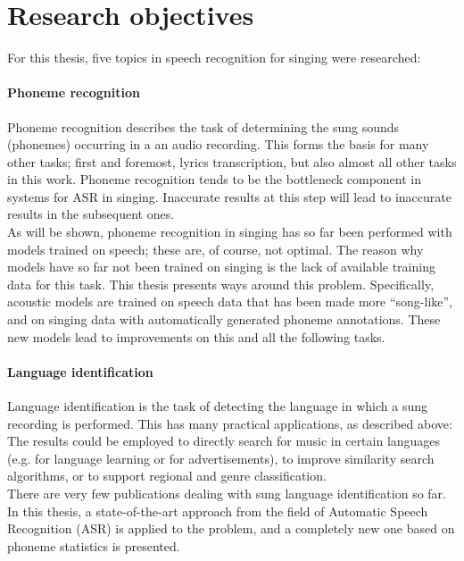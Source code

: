 \section{Research objectives}
For this thesis, five topics in speech recognition for singing were researched:

\paragraph{Phoneme recognition}
Phoneme recognition describes the task of determining the sung sounds (phonemes) occurring in a an audio recording. This forms the basis for many other tasks; first and foremost, lyrics transcription, but also almost all other tasks in this work. Phoneme recognition tends to be the bottleneck component in systems for ASR in singing. Inaccurate results at this step will lead to inaccurate results in the subsequent ones.\\
As will be shown, phoneme recognition in singing has so far been performed with models trained on speech; these are, of course, not optimal. The reason why models have so far not been trained on singing is the lack of available training data for this task. This thesis presents ways around this problem. Specifically, acoustic models are trained on speech data that has been made more ``song-like'', and on singing data with automatically generated phoneme annotations. These new models lead to improvements on this and all the following tasks.

\paragraph{Language identification}
Language identification is the task of detecting the language in which a sung recording is performed. This has many practical applications, as described above: The results could be employed to directly search for music in certain languages (e.g. for language learning or for advertisements), to improve similarity search algorithms, or to support regional and genre classification.\\
There are very few publications dealing with sung language identification so far. In this thesis, a state-of-the-art approach from the field of Automatic Speech Recognition (ASR) is applied to the problem, and a completely new one based on phoneme statistics is presented.

